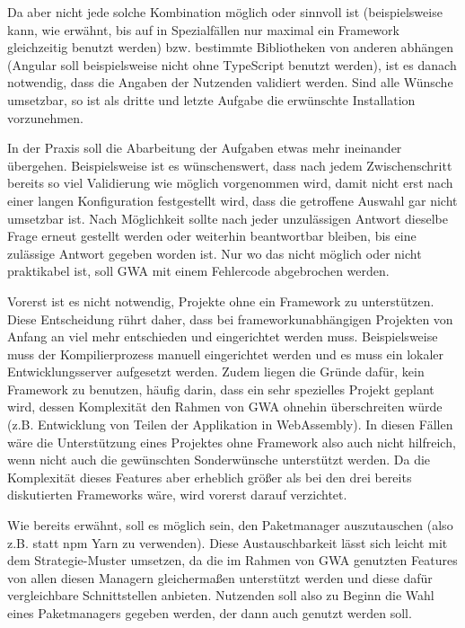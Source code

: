 Da aber nicht jede solche Kombination möglich oder sinnvoll ist (beispielsweise kann, wie erwähnt, bis auf in Spezialfällen nur maximal ein Framework gleichzeitig benutzt werden) bzw. bestimmte Bibliotheken von anderen abhängen (Angular soll beispielsweise nicht ohne TypeScript benutzt werden), ist es danach notwendig, dass die Angaben der Nutzenden validiert werden. Sind alle Wünsche umsetzbar, so ist als dritte und letzte Aufgabe die erwünschte Installation vorzunehmen.

In der Praxis soll die Abarbeitung der Aufgaben etwas mehr ineinander übergehen. Beispielsweise ist es wünschenswert, dass nach jedem Zwischenschritt bereits so viel Validierung wie möglich vorgenommen wird, damit nicht erst nach einer langen Konfiguration festgestellt wird, dass die getroffene Auswahl gar nicht umsetzbar ist. Nach Möglichkeit sollte nach jeder unzulässigen Antwort dieselbe Frage erneut gestellt werden oder weiterhin beantwortbar bleiben, bis eine zulässige Antwort gegeben worden ist. Nur wo das nicht möglich oder nicht praktikabel ist, soll \gls{GWA} mit einem Fehlercode abgebrochen werden.

Vorerst ist es nicht notwendig, Projekte ohne ein Framework zu unterstützen. Diese Entscheidung rührt daher, dass bei frameworkunabhängigen Projekten von Anfang an viel mehr entschieden und eingerichtet werden muss. Beispielsweise muss der Kompilierprozess manuell eingerichtet werden und es muss ein lokaler Entwicklungsserver aufgesetzt werden. Zudem liegen die Gründe dafür, kein Framework zu benutzen, häufig darin, dass ein sehr spezielles Projekt geplant wird, dessen Komplexität den Rahmen von \gls{GWA} ohnehin überschreiten würde (z.B. Entwicklung von Teilen der Applikation in WebAssembly). In diesen Fällen wäre die Unterstützung eines Projektes ohne Framework also auch nicht hilfreich, wenn nicht auch die gewünschten Sonderwünsche unterstützt werden. Da die Komplexität dieses Features aber erheblich größer als bei den drei bereits diskutierten Frameworks wäre, wird vorerst darauf verzichtet.

Wie bereits erwähnt, soll es möglich sein, den Paketmanager auszutauschen (also z.B. statt \gls{npm} Yarn zu verwenden). Diese Austauschbarkeit lässt sich leicht mit dem Strategie-Muster umsetzen, da die im Rahmen von \gls{GWA} genutzten Features von allen diesen Managern gleichermaßen unterstützt werden und diese dafür vergleichbare Schnittstellen anbieten. Nutzenden soll also zu Beginn die Wahl eines Paketmanagers gegeben werden, der dann auch genutzt werden soll.

